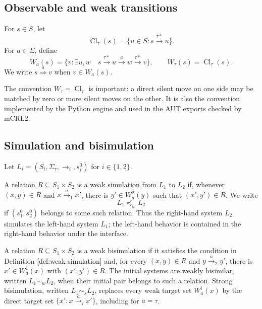 \documentclass{ws-jbcb}
\numberwithin{equation}{section}
\newcommand{\TAU}{\tau}
\newcommand{\xRightarrow}[1]{\stackrel{#1}{\Longrightarrow}}
\newcommand{\strongsim}{\mathrel{\sim_{s}}}
\newcommand{\weaksim}{\mathrel{\sim_{w}}}
\newcommand{\weakpre}{\mathrel{\preceq_{w}}}
\begin{document}
\subsection{Observable and weak transitions}\label{sec:weak-transitions}

\begin{definition}\label{def:weak-move}
For $s\in S$, let
\begin{equation}\label{eq:tau-closure}
 \operatorname{Cl}_{\TAU}(s)=
 \{u\in S:s\xrightarrow{\TAU *}u\}.
\end{equation}
For $a\in\Sigma$, define
\begin{equation}\label{eq:weak-target}
 W_a(s)=\{v:\exists u,w\quad
 s\xrightarrow{\TAU *}u\xrightarrow{a}w\xrightarrow{\TAU *}v\},
 \qquad W_{\TAU}(s)=\operatorname{Cl}_{\TAU}(s).
\end{equation}
We write $s\xRightarrow{a}v$ when $v\in W_a(s)$.
\end{definition}

The convention $W_{\TAU}=\operatorname{Cl}_{\TAU}$ is important: a direct silent
move on one side may be matched by zero or more silent moves on the other. It is
also the convention implemented by the Python engine and used in the AUT exports
checked by mCRL2.

\subsection{Simulation and bisimulation}\label{sec:relations}

Let $L_i=(S_i,\Sigma_{\TAU},\longrightarrow_i,s_i^0)$ for $i\in\{1,2\}$.

\begin{definition}\label{def:weak-simulation}
A relation $R\subseteq S_1\times S_2$ is a weak simulation from $L_1$ to $L_2$
if, whenever $(x,y)\in R$ and $x\xrightarrow{a}_1x'$, there is
$y'\in W_a^2(y)$ such that $(x',y')\in R$. We write
\begin{equation}\label{eq:simulation-orientation}
 L_1\weakpre L_2
\end{equation}
if $(s_1^0,s_2^0)$ belongs to some such relation. Thus the right-hand system
$L_2$ simulates the left-hand system $L_1$; the left-hand behavior is contained
in the right-hand behavior under the interface.
\end{definition}

\begin{definition}\label{def:bisimulation}
A relation $R\subseteq S_1\times S_2$ is a weak bisimulation if it satisfies the
condition in Definition \ref{def:weak-simulation} and, for every $(x,y)\in R$ and
$y\xrightarrow{a}_2y'$, there is $x'\in W_a^1(x)$ with $(x',y')\in R$. The
initial systems are weakly bisimilar, written $L_1\weaksim L_2$, when their
initial pair belongs to such a relation. Strong bisimulation, written
$L_1\strongsim L_2$, replaces every weak target set $W_a^i(x)$ by the direct
target set $\{x':x\xrightarrow{a}_i x'\}$, including for $a=\TAU$.
\end{definition}
\end{document}
